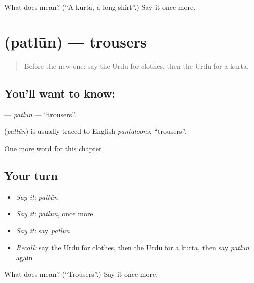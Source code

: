 \begin{tcolorbox}[breakable,colback=teal!4,colframe=teal!35!black,title={Before you move on}]
What does  mean? (\textquotedblleft{}A kurta, a long shirt\textquotedblright{}.) Say it once more.
\end{tcolorbox}
\section[\texorpdfstring{\ur{پتلون} (patlūn)}{پتلون (patlūn)}]{ (patlūn) — trousers}

\label{lesson:UR-C82-patlun}



\begin{quote}
Before the new one: say the Urdu for clothes, then the Urdu for a kurta.
\end{quote}

\subsection*{You'll want to know: }
\textbf{} — \emph{patlūn} — \textquotedblleft{}trousers\textquotedblright{}.

\begin{cousinweb}
\textbf{} (\emph{patlūn}) is usually traced to English \emph{pantaloons}, \textquotedblleft{}trousers\textquotedblright{}.
\end{cousinweb}

\begin{grammarlens}[title={What you've built}]
One more word for this chapter.
\end{grammarlens}

\subsection*{Your turn}
\begin{itemize}
\raggedright
  \item \emph{Say it:} \emph{patlūn}
  \item \emph{Say it:} \emph{patlūn}, once more
  \item \emph{Say it:} say \emph{patlūn}
  \item \emph{Recall:} say the Urdu for clothes, then the Urdu for a kurta, then say \emph{patlūn} again
\end{itemize}

\begin{tcolorbox}[breakable,colback=teal!4,colframe=teal!35!black,title={Before you move on}]
What does  mean? (\textquotedblleft{}Trousers\textquotedblright{}.) Say it once more.
\end{tcolorbox}
